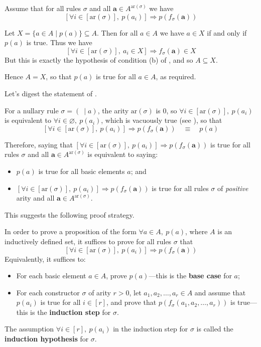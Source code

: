 \begin{cproof}
Assume that for all rules $\sigma$ and all $\mathbf{a} \in A^{\mathrm{ar}(\sigma)}$ we have
\[ [\forall i \in [\mathrm{ar}(\sigma)],~ p(a_i)] \Rightarrow p(f_{\sigma}(\mathbf{a})) \]

Let $X = \{ a \in A \mid p(a) \} \subseteq A$. Then for all $a \in A$ we have $a \in X$ if and only if $p(a)$ is true. Thus we have
\[ [\forall i \in [\mathrm{ar}(\sigma)],~ a_i \in X] \Rightarrow f_{\sigma}(\mathbf{a}) \in X \]
But this is exactly the hypothesis of condition (b) of , and so $A \subseteq X$.

Hence $A = X$, so that $p(a)$ is true for all $a \in A$, as required.
\end{cproof}

Let's digest the statement of .

For a nullary rule $\sigma = (~ \mid a)$, the arity $\mathrm{ar}(\sigma)$ is $0$, so $\forall i \in [\mathrm{ar}(\sigma)],~p(a_i)$ is equivalent to $\forall i \in \varnothing,~ p(a_i)$, which is vacuously true (see ), so that
\[ [\forall i \in [\mathrm{ar}(\sigma)],~ p(a_i)] \Rightarrow p(f_{\sigma}(\mathbf{a})) \quad \equiv \quad p(a) \]

Therefore, saying that $[\forall i \in [\mathrm{ar}(\sigma)],~ p(a_i)] \Rightarrow p(f_{\sigma}(\mathbf{a}))$ is true for all rules $\sigma$ and all $\mathbf{a} \in A^{\mathrm{ar}(\sigma)}$ is equivalent to saying:
\begin{itemize}
\item $p(a)$ is true for all basic elements $a$; and
\item $[\forall i \in [\mathrm{ar}(\sigma)],~ p(a_i)] \Rightarrow p(f_{\sigma}(\mathbf{a}))$ is true for all rules $\sigma$ of \textit{positive} arity and all $\mathbf{a} \in A^{\mathrm{ar}(\sigma)}$.
\end{itemize}

This suggests the following proof strategy.

\begin{strategy}
In order to prove a proposition of the form $\forall a \in A,~ p(a)$, where $A$ is an inductively defined set, it suffices to prove for all rules $\sigma$ that
\[ [\forall i \in [\mathrm{ar}(\sigma)],~ p(a_i)] \Rightarrow p(f_{\sigma}(\mathbf{a})) \]
Equivalently, it suffices to:
\begin{itemize}
\item For each basic element $a \in A$, prove $p(a)$---this is the \textbf{base case} for $a$;
\item For each constructor $\sigma$ of arity $r>0$, let $a_1,a_2,\dots,a_r \in A$ and assume that $p(a_i)$ is true for all $i \in [r]$, and prove that $p(f_{\sigma}(a_1,a_2,\dots,a_r))$ is true---this is the \textbf{induction step} for $\sigma$.
\end{itemize}
The assumption $\forall i \in [r],~p(a_i)$ in the induction step for $\sigma$ is called the \textbf{induction hypothesis} for $\sigma$.
\end{strategy}

